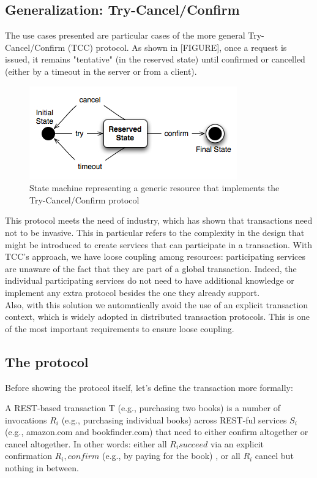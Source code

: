 \subsection{Generalization: Try-Cancel/Confirm}
The use cases presented are particular cases of the more general Try-Cancel/Confirm (TCC) protocol. As shown in [FIGURE], once a request is issued, it remains "tentative" (in the reserved state) until confirmed or cancelled (either by a timeout in the server or from a client). \\
\begin{figure} [ht]
\centering
\includegraphics[scale=0.75]{images/TCC_general.jpg}
\caption{State machine representing a generic resource that implements the Try-Cancel/Confirm protocol}
\label{tcc-general}
\end{figure}
This protocol meets the need of industry, which has shown that transactions need not to be invasive. This in particular refers to the complexity in the design that might be introduced to create services that can participate in a transaction. With TCC's approach, we have loose coupling among resources: participating services are unaware of the fact that they are part of a global transaction. Indeed, the individual participating services do not need to have additional knowledge or implement any extra protocol besides the one they already support. \\
Also, with this solution we automatically avoid the use of an explicit transaction context, which is widely adopted in distributed transaction protocols. This is one of the most important requirements to ensure loose coupling.\\

\subsection{The protocol}
Before showing the protocol itself, let's define the transaction more formally:
\begin{theodef}
\label{transaction-definition}
A REST-based transaction T (e.g., purchasing two books) is a number of invocations $R_i$ (e.g., purchasing individual books) across REST-ful services $S_i$ (e.g., amazon.com and bookfinder.com) that need to either confirm altogether or cancel altogether. In other words: either all $R_i succeed$ via an explicit confirmation $R_i,confirm$ (e.g., by paying for the book) , or all $R_i$ cancel but nothing in between.
\end{theodef}

